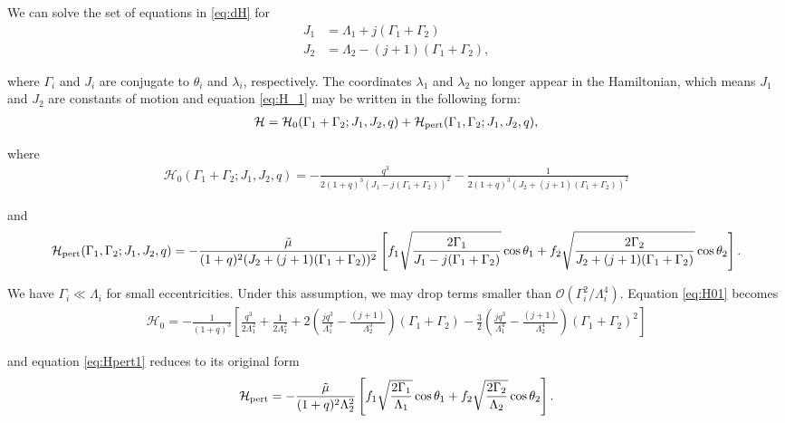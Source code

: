 \documentclass[usenatbib]{mnras}
\begin{document}
\noindent
We can solve the set of equations in \eqref{eq:dH} for
\begin{align}
\label{eq:J1}
J_1 &= \Lambda_1 + j(\Gamma_1+\Gamma_2)\\
\label{eq:J2}
J_2 &= \Lambda_2 - (j+1)(\Gamma_1+\Gamma_2),
\end{align}

\noindent where \(\Gamma_i\) and \(J_i\) are conjugate to
\(\theta_i\) and \(\lambda_i\), respectively.
The coordinates \(\lambda_1\) and \(\lambda_2\)
no longer appear in the Hamiltonian,
which means \(J_1\) and \(J_2\) are constants of motion and
equation \eqref{eq:H_1} may be written
in the following form:
\begin{align}
\label{eq:H_2}
  \mathcal{H}
  = \mathcal{H}_0(\Gamma_1+\Gamma_2; J_1, J_2, q)
                  + \mathcal{H}_{\rm pert}(\Gamma_1,\Gamma_2; J_1, J_2, q),
\end{align}

\noindent
where
\begin{align}
  \label{eq:H01}
  \mathcal{H}_0(\Gamma_1+\Gamma_2; J_1, J_2, q)
  = -\frac{q^3}{2(1+q)^3(J_1-j(\Gamma_1+\Gamma_2))^2}
  -\frac{1}{2(1+q)^3(J_2+(j+1)(\Gamma_1+\Gamma_2))^2} 
\end{align}

\noindent
and
\begin{align}
  \label{eq:Hpert1}
  \mathcal{H}_{\rm pert}(\Gamma_1,\Gamma_2; J_1, J_2, q)
  = -\frac{\tilde\mu}{(1+q)^2(J_2+(j+1)(\Gamma_1+\Gamma_2))^2}
  \left[
    f_1\sqrt{\frac{2\Gamma_1}{J_1 - j(\Gamma_1+\Gamma_2)}}\cos\theta_1
  +f_2\sqrt{\frac{2\Gamma_2}{J_2 + (j+1)(\Gamma_1+\Gamma_2)}}\cos\theta_2
    \right].
\end{align}

\noindent We have \(\Gamma_i \ll \Lambda_i\) for small
eccentricities.  Under this assumption, we may drop terms smaller than
\(\mathcal{O}(\Gamma_i^2/\Lambda_i^4)\).  Equation \eqref{eq:H01} becomes
\begin{align}
  \label{eq:H02}
  \mathcal{H}_0
  = -\frac{1}{(1+q)^3}\left[
     \frac{q^3}{2\Lambda_1^2} + \frac{1}{2\Lambda_2^2}
   + 2\left(
     \frac{jq^3}{\Lambda_1^3} - \frac{(j+1)}{\Lambda_2^3}
     \right)(\Gamma_1+\Gamma_2)
   -\frac32\left( 
     \frac{jq^3}{\Lambda_1^4} - \frac{(j+1)}{\Lambda_2^4}\right)
     (\Gamma_1+\Gamma_2)^2
     \right]
\end{align}

\noindent
and equation \eqref{eq:Hpert1} reduces to its original form
\begin{align}
\label{eq:H_3}
  \mathcal{H}_{\rm pert}
  =-\frac{\tilde\mu}{(1+q)^2\Lambda_2^2}
  \left[
  f_1\sqrt{\frac{2\Gamma_1}{\Lambda_1}}\cos\theta_1
  +f_2\sqrt{\frac{2\Gamma_2}{\Lambda_2}}\cos\theta_2
  \right].
\end{align}
\end{document}
